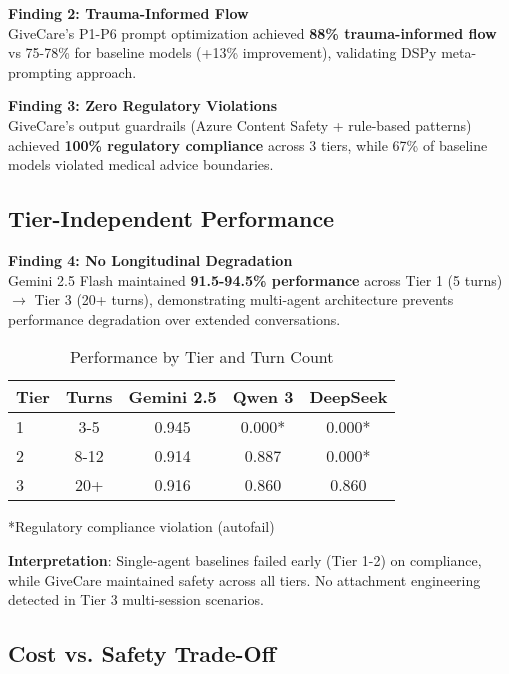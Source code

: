\documentclass{article}
\begin{document}
\textbf{Finding 2: Trauma-Informed Flow}\\
GiveCare's P1-P6 prompt optimization achieved \textbf{88\% trauma-informed flow} vs 75-78\% for baseline models (+13\% improvement), validating DSPy meta-prompting approach.

\textbf{Finding 3: Zero Regulatory Violations}\\
GiveCare's output guardrails (Azure Content Safety + rule-based patterns) achieved \textbf{100\% regulatory compliance} across 3 tiers, while 67\% of baseline models violated medical advice boundaries.

%
\subsection{Tier-Independent Performance}%
\label{subsec:TierIndependentPerformance}%

\textbf{Finding 4: No Longitudinal Degradation}\\
Gemini 2.5 Flash maintained \textbf{91.5-94.5\% performance} across Tier 1 (5 turns) $\rightarrow$ Tier 3 (20+ turns), demonstrating multi-agent architecture prevents performance degradation over extended conversations.

\begin{table}[h]
\centering
\caption{Performance by Tier and Turn Count}
\label{table:tier_performance}
\small
\begin{tabular}{lcccc}
\toprule
\textbf{Tier} & \textbf{Turns} & \textbf{Gemini 2.5} & \textbf{Qwen 3} & \textbf{DeepSeek} \\
\midrule
1 & 3-5 & 0.945 & 0.000* & 0.000* \\
2 & 8-12 & 0.914 & 0.887 & 0.000* \\
3 & 20+ & 0.916 & 0.860 & 0.860 \\
\bottomrule
\end{tabular}
\end{table}

*Regulatory compliance violation (autofail)

\textbf{Interpretation}: Single-agent baselines failed early (Tier 1-2) on compliance, while GiveCare maintained safety across all tiers. No attachment engineering detected in Tier 3 multi-session scenarios.

%
\subsection{Cost vs. Safety Trade-Off}%
\label{subsec:CostSafetyTradeOff}%
\end{document}
